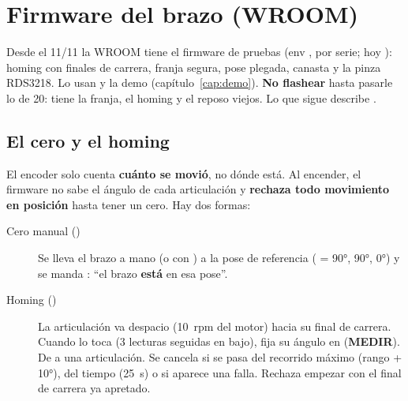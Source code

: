\section{Firmware del brazo (WROOM)}

\begin{peligro}
Desde el 11/11 la WROOM tiene el firmware de pruebas  (env , por
serie; hoy ): homing con finales de carrera, franja segura, pose plegada, canasta y la
pinza RDS3218. Lo usan  y la demo (capítulo~\ref{cap:demo}). \textbf{No flashear} 
hasta pasarle lo de 20: tiene la franja, el homing y el reposo viejos. Lo que sigue describe .
\end{peligro}

\subsection{El cero y el homing}
El encoder solo cuenta \textbf{cuánto se movió}, no dónde está. Al encender, el firmware no sabe el ángulo de cada
articulación y \textbf{rechaza todo movimiento en posición} hasta tener un cero. Hay dos formas:

\begin{description}
  \item[Cero manual ()] Se lleva el brazo a mano (o con ) a la pose de referencia
        ( = 90°, 90°, 0°) y se manda : ``el brazo \textbf{está} en esa pose''.
  \item[Homing ()] La articulación  va despacio (10~rpm del motor) hacia su final de carrera.
        Cuando lo toca (3 lecturas seguidas en bajo), fija su ángulo en  (\textbf{MEDIR}). De a una
        articulación. Se cancela si se pasa del recorrido máximo (rango + 10°), del tiempo (25~s) o si aparece una
        falla. Rechaza empezar con el final de carrera ya apretado.
\end{description}

